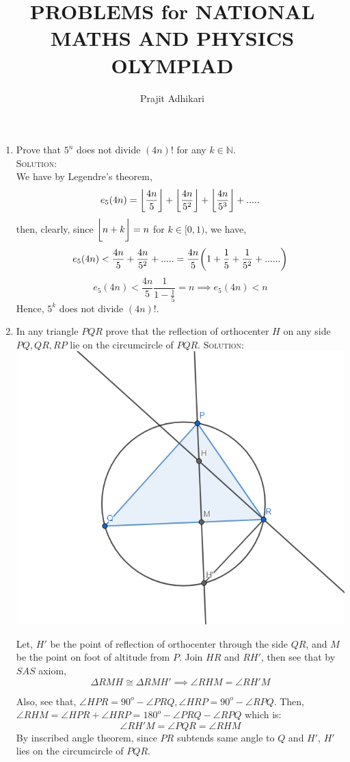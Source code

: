 \documentclass{article}
\begin{document}
\title{PROBLEMS for NATIONAL MATHS AND PHYSICS OLYMPIAD}
\author{Prajit Adhikari}
\maketitle

\begin{enumerate}
    \item Prove that $5^n$ does not divide $(4n)!$ for any $k \in \mathbb{N}$.\\
    \textsc{Solution: }\\
    We have by Legendre's theorem,\\
    $$e_5(4n)= \bigg{\lfloor} \frac{4n}{5}  \bigg{\rfloor} + \bigg{\lfloor} \frac{4n}{5^2}  \bigg{\rfloor} + \bigg{\lfloor} \frac{4n}{5^3}  \bigg{\rfloor} +.....$$
    then, clearly, since $\bigg{\lfloor} n+k \bigg{\rfloor} =n$ for $k \in [0,1)$, we have,
    $$e_5(4n)< \frac{4n}{5}+ \frac{4n}{5^2}+.....= \frac{4n}{5}\bigg{(} 1+ \frac{1}{5} +\frac{1}{5^2} + ...... \bigg{)}$$
    $$e_5(4n)<\frac{4n}{5} \frac{1}{1-\frac{1}{5}} = n \implies e_5(4n) < n$$
    Hence, $5^k$ does not divide $(4n)!$.
    
    
    
    
    \item In any triangle $PQR$ prove that the reflection of orthocenter $H$ on any side $PQ, QR, RP$ lie on the circumcircle of $PQR$.
     \newline
    \textsc{Solution: }\\


    \includegraphics[width=5.5 cm]{Maths/geomtry.PNG}

    Let, $H'$ be the point of reflection of orthocenter through the side $QR$, and $M$ be the point on foot of altitude from $P$.
    Join $HR$ and $RH'$, then see that by $SAS$ axiom, 
    $$\Delta{RMH} \cong \Delta{RMH'} \implies \angle{RHM} = \angle{RH'M}$$
    
    Also, see that,
    $\angle{HPR} = 90^o - \angle{PRQ}, \angle{HRP} = 90^o - \angle{RPQ} $.
    Then, $\angle{RHM}=\angle{HPR}+\angle{HRP} =180^o -\angle{PRQ}-\angle{RPQ} $
    which is:
    $$ \angle{RH'M} = \angle{PQR} =\angle{RHM}$$
    By inscribed angle theorem, since $PR$ subtends same angle to $Q$ and $H'$, $H'$ lies on the circumcircle of $PQR$.\\
    

\end{enumerate}
\end{document}
